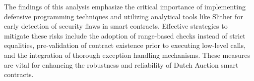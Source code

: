 \documentclass[conference]{IEEEtran}
\begin{document}
The findings of this analysis emphasize the critical importance of implementing defensive programming techniques and utilizing analytical tools like Slither for early detection of security flaws in smart contracts. Effective strategies to mitigate these risks include the adoption of range-based checks instead of strict equalities, pre-validation of contract existence prior to executing low-level calls, and the integration of thorough exception handling mechanisms. These measures are vital for enhancing the robustness and reliability of Dutch Auction smart contracts.




 

\end{document}
